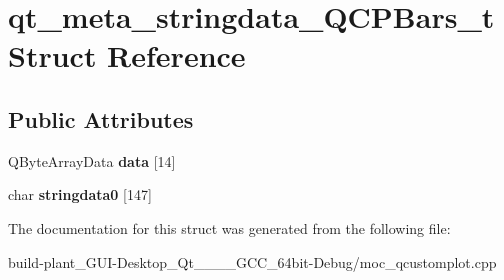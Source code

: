 \hypertarget{structqt__meta__stringdata__QCPBars__t}{}\section{qt\+\_\+meta\+\_\+stringdata\+\_\+\+Q\+C\+P\+Bars\+\_\+t Struct Reference}
\label{structqt__meta__stringdata__QCPBars__t}
\subsection*{Public Attributes}
\begin{DoxyCompactItemize}
\item 
\mbox{\label{structqt__meta__stringdata__QCPBars__t_a40d7e47e2037dd5bb7c67e6397d92852}} 
Q\+Byte\+Array\+Data {\bfseries data} \mbox{[}14\mbox{]}
\item 
\mbox{\label{structqt__meta__stringdata__QCPBars__t_ab1c5ceea0b404e0edfc8690c1a945309}} 
char {\bfseries stringdata0} \mbox{[}147\mbox{]}
\end{DoxyCompactItemize}


The documentation for this struct was generated from the following file\+:\begin{DoxyCompactItemize}
\item 
build-\/plant\+\_\+\+G\+U\+I-\/\+Desktop\+\_\+\+Qt\+\_\+\_\+\_\+\_\+\+G\+C\+C\+\_\+64bit-\/\+Debug/moc\+\_\+qcustomplot.\+cpp\end{DoxyCompactItemize}
